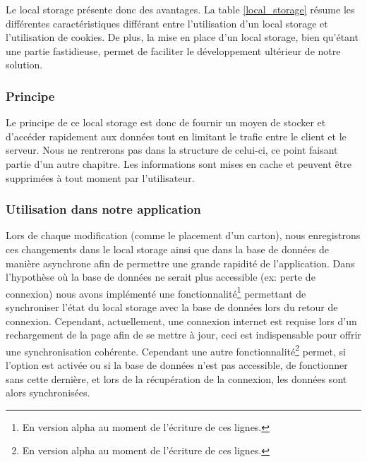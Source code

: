 



Le local storage présente donc des avantages. La table \ref{local_storage} résume les différentes caractéristiques différant entre l'utilisation d'un local storage et l'utilisation de cookies.
\newline
\indent
De plus, la mise en place d'un local storage, bien qu'étant une partie fastidieuse, permet de faciliter le développement ultérieur de notre solution.

  
\subsubsection{Principe}

Le principe de ce local storage est donc de fournir un moyen de stocker et d'accéder rapidement aux données tout en limitant le trafic entre le client et le serveur. Nous ne rentrerons pas dans la structure de celui-ci, ce point faisant partie d'un autre chapitre. Les informations sont mises en cache et peuvent être supprimées à tout moment par l'utilisateur.

\subsubsection{Utilisation dans notre application}
Lors de chaque modification (comme le placement d'un carton), nous enregistrons ces changements dans le local storage ainsi que dans la base de données de manière asynchrone afin de permettre une grande rapidité de l'application. 
\newline
\indent
Dans l'hypothèse où la base de données ne serait plus accessible (ex: perte de connexion) nous avons implémenté une fonctionnalité\footnote{En version alpha au moment de l'écriture de ces lignes.} permettant de synchroniser l'état du local storage avec la base de données lors du retour de connexion.
\newline
\indent
Cependant, actuellement, une connexion internet est requise lors d'un rechargement de la page afin de se mettre à jour, ceci est indispensable pour offrir une synchronisation cohérente. Cependant une autre fonctionnalité\footnote{En version alpha au moment de l'écriture de ces lignes.} permet, si l'option est activée ou si la base de données n'est pas accessible, de fonctionner sans cette dernière, et lors de la récupération de la connexion, les données sont alors synchronisées.



